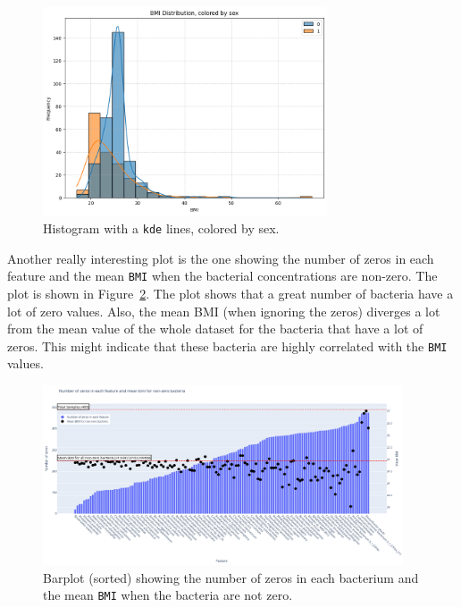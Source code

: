 \documentclass[12pt]{article}
\begin{document}
\begin{figure}[H]
    \centering
    \includegraphics[width=0.75\textwidth]{ims/bmi_hist_by_sex.png}
    \caption{Histogram with a \texttt{kde} lines, colored by sex.}
    \label{fig:bmi_hist_by_sex}
\end{figure}

Another really interesting plot is the one showing the number of zeros in each
feature and the mean \texttt{BMI} when the bacterial concentrations are non-zero.
The plot is shown in Figure~\ref{fig:zeros}. The plot shows that a great number of
bacteria have a lot of zero values. Also, the mean BMI (when ignoring the zeros)
diverges a lot from the mean value of the whole dataset for the bacteria that have a
lot of zeros. This might indicate that these bacteria are highly correlated with the
\texttt{BMI} values.

\begin{figure}[H]
    \centering
    \includegraphics[width=0.95\textwidth]{ims/zeros_and_mean_for_non_zeros.png}
    \caption{Barplot (sorted) showing the number of zeros in each bacterium and the
    mean \texttt{BMI} when the bacteria are not zero.}
    \label{fig:zeros}
\end{figure}
\end{document}
